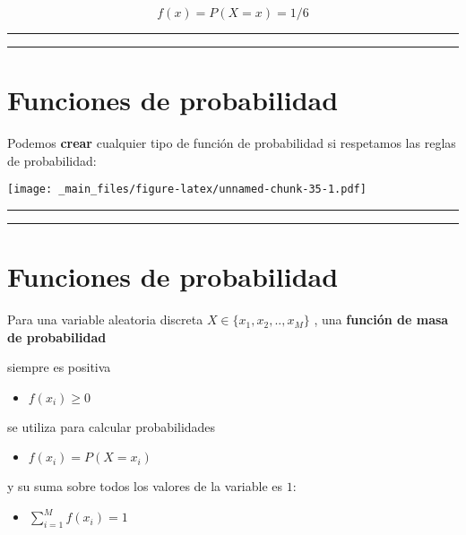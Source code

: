 \documentclass[
]{book}
\providecommand{\tightlist}{%
  \setlength{\itemsep}{0pt}\setlength{\parskip}{0pt}}
\begin{document}
\[f(x)=P(X=x)=1/6\]

\begin{center}\rule{0.5\linewidth}{0.5pt}\end{center}

\begin{center}\rule{0.5\linewidth}{0.5pt}\end{center}

\hypertarget{funciones-de-probabilidad-1}{%
\section{Funciones de probabilidad}\label{funciones-de-probabilidad-1}}

Podemos \textbf{crear} cualquier tipo de función de probabilidad si respetamos las reglas de probabilidad:

\texttt{[image: \_main\_files/figure-latex/unnamed-chunk-35-1.pdf]}

\begin{center}\rule{0.5\linewidth}{0.5pt}\end{center}

\begin{center}\rule{0.5\linewidth}{0.5pt}\end{center}

\hypertarget{funciones-de-probabilidad-2}{%
\section{Funciones de probabilidad}\label{funciones-de-probabilidad-2}}

Para una variable aleatoria discreta \(X \in \{x_1 , x_2 , .. , x_M\}\) , una \textbf{función de masa de probabilidad}

siempre es positiva

\begin{itemize}
\tightlist
\item
  \(f(x_i)\geq 0\)
\end{itemize}

se utiliza para calcular probabilidades

\begin{itemize}
\tightlist
\item
  \(f(x_i)=P(X=x_i)\)
\end{itemize}

y su suma sobre todos los valores de la variable es \(1\):

\begin{itemize}
\tightlist
\item
  \(\sum_{i=1}^M f(x_i)=1\)
\end{itemize}
\end{document}
